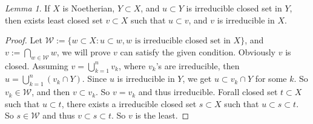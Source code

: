 \documentclass{ctexart}
\theoremstyle{remark}
\newtheorem{lemma}{Lemma}
\newcommand\<{\langle}
\renewcommand\>{\rangle}
\begin{document}
\begin{lemma}\label{lem:sub}
If $X$ is Noetherian, $Y\subset X$, and $u\subset Y$ is irreducible closed set in $Y$, then exists least closed set $v\subset X$ such that $u\subset v$, and $v$ is irreducible in $X$.
\end{lemma}
\begin{proof}
Let $\mathcal{W}:=\{w\subset X:u\subset w,w \text{ is irreducible closed set in }X\}$, and $v:=\bigcap_{w\in \mathcal{W}}w$, we will prove $v$ can satisfy the given condition. Obviously $v$ is closed. Assuming $v=\bigcup_{k=1}^n v_k$, where $v_k$'s are irreducible, then $u=\bigcup_{k=1}^n (v_k\cap Y)$. Since $u$ is irreducible in $Y$, we get $u\subset v_k\cap Y$ for some $k$. So $v_k\in\mathcal{W}$, and then $v\subset v_k$. So $v=v_k$ and thus irreducible. Forall closed set $t\subset X$ such that $u\subset t$, there exists a irreducible closed set $s\subset X$ such that $u\subset s\subset t$. So $s\in\mathcal{W}$ and thus $v\subset s\subset t$. So $v$ is the least. 
\end{proof}
\end{document}
